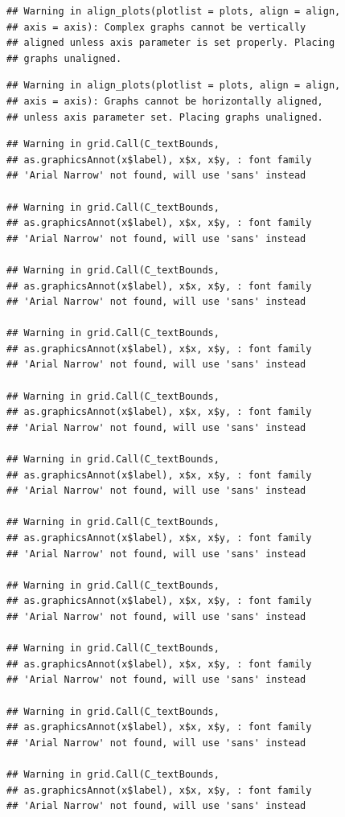 \documentclass[]{krantz}
\begin{document}
\begin{verbatim}
## Warning in align_plots(plotlist = plots, align = align,
## axis = axis): Complex graphs cannot be vertically
## aligned unless axis parameter is set properly. Placing
## graphs unaligned.
\end{verbatim}

\begin{verbatim}
## Warning in align_plots(plotlist = plots, align = align,
## axis = axis): Graphs cannot be horizontally aligned,
## unless axis parameter set. Placing graphs unaligned.
\end{verbatim}

\begin{verbatim}
## Warning in grid.Call(C_textBounds,
## as.graphicsAnnot(x$label), x$x, x$y, : font family
## 'Arial Narrow' not found, will use 'sans' instead

## Warning in grid.Call(C_textBounds,
## as.graphicsAnnot(x$label), x$x, x$y, : font family
## 'Arial Narrow' not found, will use 'sans' instead

## Warning in grid.Call(C_textBounds,
## as.graphicsAnnot(x$label), x$x, x$y, : font family
## 'Arial Narrow' not found, will use 'sans' instead

## Warning in grid.Call(C_textBounds,
## as.graphicsAnnot(x$label), x$x, x$y, : font family
## 'Arial Narrow' not found, will use 'sans' instead

## Warning in grid.Call(C_textBounds,
## as.graphicsAnnot(x$label), x$x, x$y, : font family
## 'Arial Narrow' not found, will use 'sans' instead

## Warning in grid.Call(C_textBounds,
## as.graphicsAnnot(x$label), x$x, x$y, : font family
## 'Arial Narrow' not found, will use 'sans' instead

## Warning in grid.Call(C_textBounds,
## as.graphicsAnnot(x$label), x$x, x$y, : font family
## 'Arial Narrow' not found, will use 'sans' instead

## Warning in grid.Call(C_textBounds,
## as.graphicsAnnot(x$label), x$x, x$y, : font family
## 'Arial Narrow' not found, will use 'sans' instead

## Warning in grid.Call(C_textBounds,
## as.graphicsAnnot(x$label), x$x, x$y, : font family
## 'Arial Narrow' not found, will use 'sans' instead

## Warning in grid.Call(C_textBounds,
## as.graphicsAnnot(x$label), x$x, x$y, : font family
## 'Arial Narrow' not found, will use 'sans' instead

## Warning in grid.Call(C_textBounds,
## as.graphicsAnnot(x$label), x$x, x$y, : font family
## 'Arial Narrow' not found, will use 'sans' instead


\end{verbatim}
\end{document}
